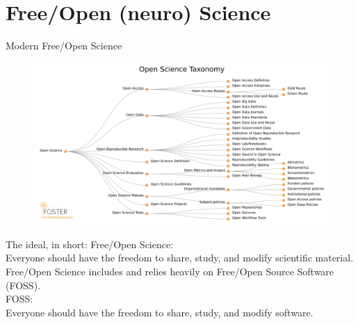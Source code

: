 \begin{frame}
  \titlepage{}
\end{frame}

\section{Free/Open (neuro) Science}
\begin{frame}[c]{Modern Free/Open Science}
  \begin{figure}[htpb]
    \centering
    \includegraphics[width=\linewidth]{images/openscience-taxonomy.png}
  \end{figure}
\end{frame}
\begin{frame}[c]{The ideal, in short:}
  Free/Open Science:\\\alert{Everyone} should have the freedom to \alert{share, study, and modify} scientific material.\\
  \pause{}
  \vspace{0.5cm}
  \alert{Free/Open Science includes and relies heavily on Free/Open Source Software (FOSS).}\\
  \pause{}
  \vspace{0.5cm}
  FOSS\@:\\\alert{Everyone} should have the freedom to \alert{share, study, and modify} software\footnotemark[5].\\
\end{frame}
